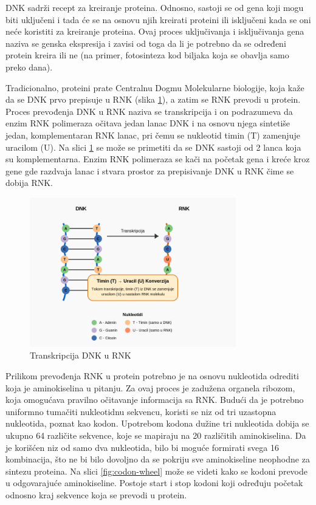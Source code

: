 \documentclass[12pt,oneside]{memoir}
\begin{document}
DNK sadrži recept za kreiranje proteina. Odnosno, sastoji se od gena koji mogu biti uključeni i tada će se na osnovu njih kreirati proteini ili isključeni kada se oni neće koristiti za kreiranje proteina. Ovaj proces uključivanja i isključivanja gena naziva se genska ekspresija i zavisi od toga da li je potrebno da se određeni protein kreira ili ne (na primer, fotosinteza kod biljaka koja se obavlja samo preko dana).

Tradicionalno, proteini prate Centralnu Dogmu Molekularne biologije, koja kaže da se DNK prvo prepisuje u RNK (slika \ref{fig:transkripcija}), a zatim se RNK prevodi u protein. Proces prevođenja DNK u RNK naziva se transkripcija i on podrazumeva da enzim RNK polimeraza očitava jedan lanac DNK i na osnovu njega sintetiše jedan, komplementaran RNK lanac, pri čemu se nukleotid timin (T) zamenjuje uracilom (U). Na slici \ref{fig:transkripcija} se može se primetiti da se DNK sastoji od 2 lanca koja su komplementarna. Enzim RNK polimeraza se kači na početak gena i kreće kroz gene gde razdvaja lanac i stvara prostor za prepisivanje DNK u RNK čime se dobija RNK.

\begin{figure}[h]
  \centering
  \includegraphics[width=0.8\textwidth]{images/dna_rna_transcription_diagram.png}
  \caption{Transkripcija DNK u RNK}
  \label{fig:transkripcija}
\end{figure}

Prilikom prevođenja RNK u protein potrebno je na osnovu nukleotida odrediti koja je aminokiselina u pitanju. Za ovaj proces je zadužena organela ribozom, koja omogućava pravilno očitavanje informacija sa RNK. Budući da je potrebno uniformno tumačiti nukleotidnu sekvencu, koristi se niz od tri uzastopna nukleotida, poznat kao kodon. Upotrebom kodona dužine tri nukleotida dobija se ukupno 64 različite sekvence, koje se mapiraju na 20 različitih aminokiselina. Da je korišćen niz od samo dva nukleotida, bilo bi moguće formirati svega 16 kombinacija, što ne bi bilo dovoljno da se pokriju sve aminokiseline neophodne za sintezu proteina. Na slici \ref{fig:codon-wheel} može se videti kako se kodoni prevode u odgovarajuće aminokiseline. Postoje start i stop kodoni koji određuju početak odnosno kraj sekvence koja se prevodi u protein.
\end{document}
